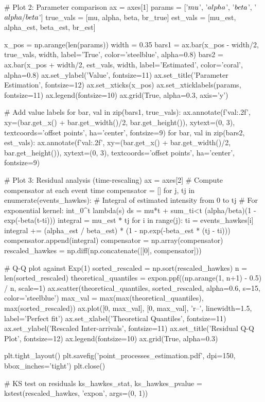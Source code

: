 \documentclass[a4paper, 11pt]{article}
\begin{document}
\begin{pycode}
# Plot 2: Parameter comparison
ax = axes[1]
params = ['$\\mu$', '$\\alpha$', '$\\beta$', '$\\alpha/\\beta$']
true_vals = [mu, alpha, beta, br_true]
est_vals = [mu_est, alpha_est, beta_est, br_est]

x_pos = np.arange(len(params))
width = 0.35
bars1 = ax.bar(x_pos - width/2, true_vals, width, label='True', color='steelblue', alpha=0.8)
bars2 = ax.bar(x_pos + width/2, est_vals, width, label='Estimated', color='coral', alpha=0.8)
ax.set_ylabel('Value', fontsize=11)
ax.set_title('Parameter Estimation', fontsize=12)
ax.set_xticks(x_pos)
ax.set_xticklabels(params, fontsize=11)
ax.legend(fontsize=10)
ax.grid(True, alpha=0.3, axis='y')

# Add value labels
for bar, val in zip(bars1, true_vals):
    ax.annotate(f'{val:.2f}', xy=(bar.get_x() + bar.get_width()/2, bar.get_height()),
                xytext=(0, 3), textcoords='offset points', ha='center', fontsize=9)
for bar, val in zip(bars2, est_vals):
    ax.annotate(f'{val:.2f}', xy=(bar.get_x() + bar.get_width()/2, bar.get_height()),
                xytext=(0, 3), textcoords='offset points', ha='center', fontsize=9)

# Plot 3: Residual analysis (time-rescaling)
ax = axes[2]
# Compute compensator at each event time
compensator = []
for j, tj in enumerate(events_hawkes):
    # Integral of estimated intensity from 0 to tj
    # For exponential kernel: int_0^t lambda(s) ds = mu*t + sum_{ti<t} (alpha/beta)(1 - exp(-beta(t-ti)))
    integral = mu_est * tj
    for i in range(j):
        ti = events_hawkes[i]
        integral += (alpha_est / beta_est) * (1 - np.exp(-beta_est * (tj - ti)))
    compensator.append(integral)
compensator = np.array(compensator)
rescaled_hawkes = np.diff(np.concatenate([[0], compensator]))

# Q-Q plot against Exp(1)
sorted_rescaled = np.sort(rescaled_hawkes)
n = len(sorted_rescaled)
theoretical_quantiles = expon.ppf((np.arange(1, n+1) - 0.5) / n, scale=1)
ax.scatter(theoretical_quantiles, sorted_rescaled, alpha=0.6, s=15, color='steelblue')
max_val = max(max(theoretical_quantiles), max(sorted_rescaled))
ax.plot([0, max_val], [0, max_val], 'r--', linewidth=1.5, label='Perfect fit')
ax.set_xlabel('Theoretical Quantiles', fontsize=11)
ax.set_ylabel('Rescaled Inter-arrivals', fontsize=11)
ax.set_title('Residual Q-Q Plot', fontsize=12)
ax.legend(fontsize=10)
ax.grid(True, alpha=0.3)

plt.tight_layout()
plt.savefig('point_processes_estimation.pdf', dpi=150, bbox_inches='tight')
plt.close()

# KS test on residuals
ks_hawkes_stat, ks_hawkes_pvalue = kstest(rescaled_hawkes, 'expon', args=(0, 1))
\end{pycode}
\end{document}
